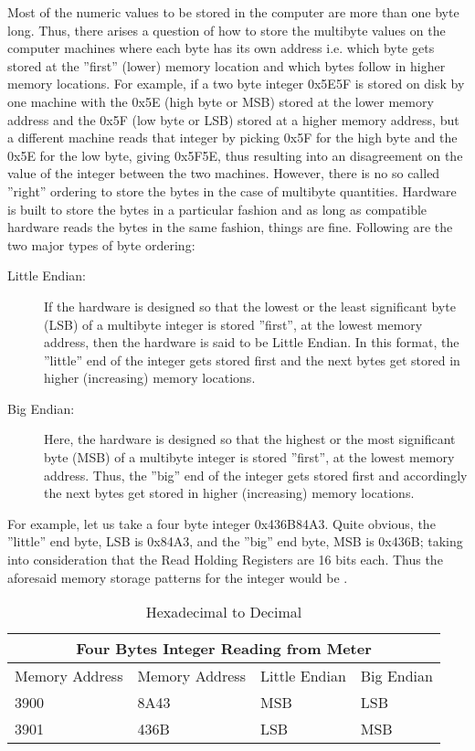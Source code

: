Most of the numeric values to be stored in the computer are more than
one byte long. Thus, there arises a question of how to store the
multibyte values on the computer machines where each byte has its own
address i.e. which byte gets stored at the ''first'' (lower) memory
location and which bytes follow in higher memory locations. For
example, if a two byte integer 0x5E5F is stored on disk by one machine
with the 0x5E (high byte or MSB) stored at the lower memory address
and the 0x5F (low byte or LSB) stored at a higher memory address, but
a different machine reads that integer by picking 0x5F for the high
byte and the 0x5E for the low byte, giving 0x5F5E, thus resulting into
an disagreement on the value of the integer between the two
machines. However, there is no so called ''right'' ordering to store
the bytes in the case of multibyte quantities. Hardware is built to
store the bytes in a particular fashion and as long as compatible
hardware reads the bytes in the same fashion, things are
fine. Following are the two major types of byte ordering: 

\begin{description}
\item [Little Endian:]
If the hardware is designed so that the lowest or the least
significant byte (LSB) of a multibyte integer is stored ''first'', at
the lowest memory address, then the hardware is said to be Little
Endian. In this format, the ''little'' end of the integer gets stored
first and the next bytes get stored in higher (increasing) memory
locations.  
\item [Big Endian:]
Here, the hardware is designed so that the highest or the most
significant byte (MSB) of a multibyte integer is stored ''first'', at
the lowest memory address. Thus, the ''big'' end of the integer gets
stored first and accordingly the next bytes get stored in higher
(increasing) memory locations.  
\end{description}
For example, let us take a four byte integer 0x436B84A3. Quite
obvious, the ''little'' end byte, LSB is 0x84A3, and the ''big'' end
byte, MSB is 0x436B; taking into consideration that the Read Holding
Registers are 16 bits each. Thus the aforesaid memory storage patterns
for the integer would be .

\begin{table}
\centering
\caption{Hexadecimal to Decimal}
\label{tab:ieee-decimal}
\begin{tabular}{ |p{3cm}|p{3cm}|p{3cm}|p{3cm}|}

\hline
\multicolumn{4}{|c|}{Four Bytes Integer Reading from Meter} \\
\hline

            Memory Address & Memory Address & Little Endian & Big Endian \\ \hline
            3900 & 8A43 & MSB & LSB \\
            3901 & 436B & LSB & MSB \\ \hline
          \end{tabular}
\end{table}


